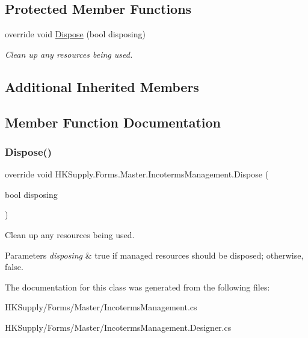 \subsection*{Protected Member Functions}
\begin{DoxyCompactItemize}
\item 
override void \mbox{\hyperlink{class_h_k_supply_1_1_forms_1_1_master_1_1_incoterms_management_a51a577b0ebf21e1e96fd05d8245ca596}{Dispose}} (bool disposing)
\begin{DoxyCompactList}\small\item\em Clean up any resources being used. \end{DoxyCompactList}\end{DoxyCompactItemize}
\subsection*{Additional Inherited Members}


\subsection{Member Function Documentation}
\mbox{\label{class_h_k_supply_1_1_forms_1_1_master_1_1_incoterms_management_a51a577b0ebf21e1e96fd05d8245ca596}} 
\subsubsection{\texorpdfstring{Dispose()}{Dispose()}}
{\footnotesize\ttfamily override void H\+K\+Supply.\+Forms.\+Master.\+Incoterms\+Management.\+Dispose (\begin{DoxyParamCaption}\item[{bool}]{disposing }\end{DoxyParamCaption})\hspace{0.3cm}{\ttfamily [protected]}}



Clean up any resources being used. 


\begin{DoxyParams}{Parameters}
{\em disposing} & true if managed resources should be disposed; otherwise, false.\\
\hline
\end{DoxyParams}


The documentation for this class was generated from the following files\+:\begin{DoxyCompactItemize}
\item 
H\+K\+Supply/\+Forms/\+Master/Incoterms\+Management.\+cs\item 
H\+K\+Supply/\+Forms/\+Master/Incoterms\+Management.\+Designer.\+cs\end{DoxyCompactItemize}
